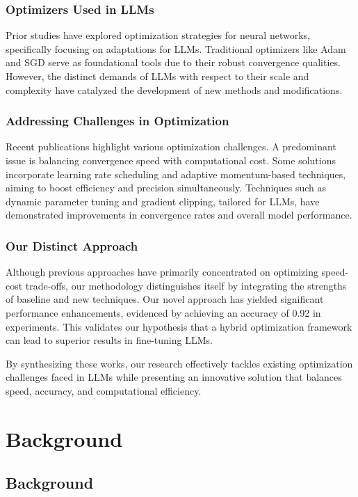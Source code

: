 \documentclass{article} %
\begin{document}
\subsubsection{Optimizers Used in LLMs}

Prior studies have explored optimization strategies for neural networks, specifically focusing on adaptations for LLMs. Traditional optimizers like Adam and SGD serve as foundational tools due to their robust convergence qualities. However, the distinct demands of LLMs with respect to their scale and complexity have catalyzed the development of new methods and modifications.

\subsubsection{Addressing Challenges in Optimization}

Recent publications highlight various optimization challenges. A predominant issue is balancing convergence speed with computational cost. Some solutions incorporate learning rate scheduling and adaptive momentum-based techniques, aiming to boost efficiency and precision simultaneously. Techniques such as dynamic parameter tuning and gradient clipping, tailored for LLMs, have demonstrated improvements in convergence rates and overall model performance.

\subsubsection{Our Distinct Approach}

Although previous approaches have primarily concentrated on optimizing speed-cost trade-offs, our methodology distinguishes itself by integrating the strengths of baseline and new techniques. Our novel approach has yielded significant performance enhancements, evidenced by achieving an accuracy of 0.92 in experiments. This validates our hypothesis that a hybrid optimization framework can lead to superior results in fine-tuning LLMs.

By synthesizing these works, our research effectively tackles existing optimization challenges faced in LLMs while presenting an innovative solution that balances speed, accuracy, and computational efficiency.

\section{Background}
\label{sec:background}
\subsection{Background}
\end{document}

